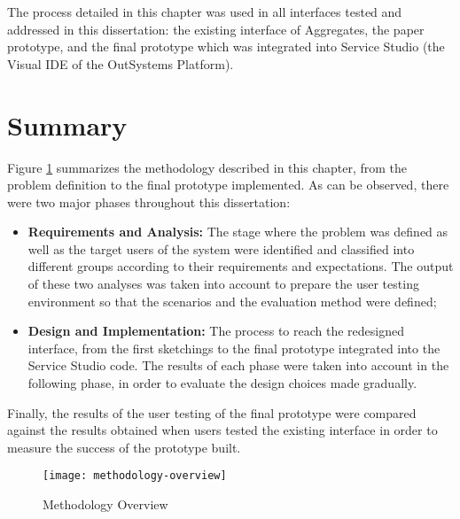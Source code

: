The process detailed in this chapter was used in all interfaces tested and addressed in this dissertation: the existing interface of Aggregates, the paper prototype, and the final prototype which was integrated into Service Studio (the Visual \gls{IDE} of the OutSystems Platform). 

\section{Summary}
\label{sec:summary}
Figure \ref{fig:methodologyOverview} summarizes the methodology described in this chapter, from the problem definition to the final prototype implemented. As can be observed, there were two major phases throughout this dissertation:

\begin{itemize}
    \item \textbf{Requirements and Analysis: } The stage where the problem was defined as well as the target users of the system were identified and classified into different groups according to their requirements and expectations. The output of these two analyses was taken into account to prepare the user testing environment so that the scenarios and the evaluation method were defined;
    \item \textbf{Design and Implementation: } The process to reach the redesigned interface, from the first sketchings to the final prototype integrated into the Service Studio code. The results of each phase were taken into account in the following phase, in order to evaluate the design choices made gradually.
\end{itemize}

Finally, the results of the user testing of the final prototype were compared against the results obtained when users tested the existing interface in order to measure the success of the prototype built.

\begin{figure}[htbp]
	\centering
	\texttt{[image: methodology-overview]}
	\caption{Methodology Overview}
	\label{fig:methodologyOverview}
\end{figure}